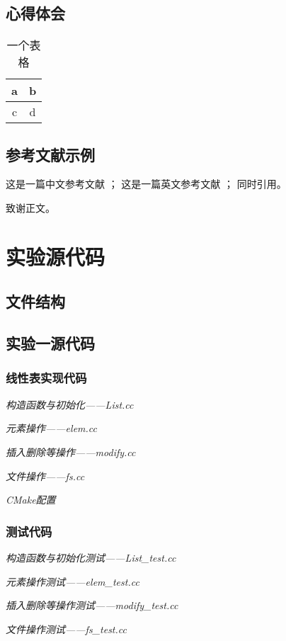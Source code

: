 \documentclass[format=draft,language=chinese,category=academic-report]{hustreport}
\begin{document}
\section{心得体会}\label{sec:5}

\begin{table}[!h]
\centering
\caption{一个表格}\label{tab:1}
\begin{tabular}{|c|c|}
\hline
a & b \\
\hline
c & d \\
\hline
\end{tabular}
\end{table}

\section{参考文献示例}
这是一篇中文参考文献\cite{TEXGURU99} ； 这是一篇英文参考文献\cite{knuth} ； 同时引用\cite{TEXGURU99,knuth}。

\backmatter

\begin{ack}
致谢正文。
\end{ack}



\appendix

\chapter{实验源代码}\label{appendix:1}
\section{文件结构}\label{appendix:structure}

\section{实验一源代码}\label{appendix:lab1}
\subsection{线性表实现代码}
\emph{构造函数与初始化——List.cc}

\emph{元素操作——elem.cc}

\emph{插入删除等操作——modify.cc}

\emph{文件操作——fs.cc}

\emph{CMake配置}

\subsection{测试代码}\label{appendix:test1}
\emph{构造函数与初始化测试——List\_test.cc}

\emph{元素操作测试——elem\_test.cc}

\emph{插入删除等操作测试——modify\_test.cc}

\emph{文件操作测试——fs\_test.cc}

\end{document}
